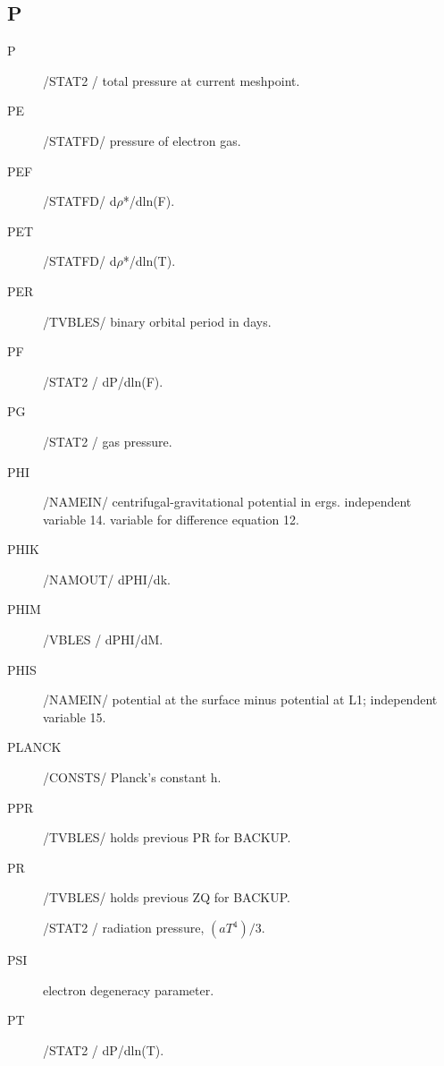 \documentclass{article}
\begin{document}
\subsection*{P}
\begin{description}
	\item[P]		    /STAT2 / total pressure at current meshpoint.

	\item[PE]      	/STATFD/ pressure of electron gas.

	\item[PEF]     	/STATFD/ d$\rho$*/dln(F).

	\item[PET]     	/STATFD/ d$\rho$*/dln(T).

	\item[PER]		    /TVBLES/ binary orbital period in days.

	\item[PF]		    /STAT2 / dP/dln(F).

	\item[PG]		    /STAT2 / gas pressure.

	\item[PHI]     	/NAMEIN/ centrifugal-gravitational potential in ergs.
			        independent variable 14.  variable for difference equation 12.

	\item[PHIK]    	/NAMOUT/ dPHI/dk.

	\item[PHIM]    	/VBLES / dPHI/dM.

	\item[PHIS]    	/NAMEIN/ potential at the surface minus potential at L1; independent variable 15.

	\item[PLANCK]		/CONSTS/ Planck's constant h.

	\item[PPR]     	/TVBLES/ holds previous PR for BACKUP.

	\item[PR]      	/TVBLES/ holds previous ZQ for BACKUP.

	            /STAT2 / radiation pressure, $(a T^4)/3$.

	\item[PSI]		    electron degeneracy parameter.

	\item[PT]		    /STAT2 / dP/dln(T).


\end{description}
\end{document}
